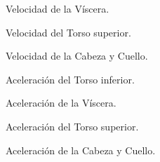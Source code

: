 \begin{figure}[htbp!]
  \centering
  \resizebox{\linewidth}{!}{
    
  }
  \caption{Velocidad de la Víscera.}
  \label{fig:v2}
\end{figure}

\begin{figure}[htbp!]
  \centering
  \resizebox{\linewidth}{!}{
    
  }
  \caption{Velocidad del Torso superior.}
  \label{fig:v3}
\end{figure}

\begin{figure}[htbp!]
  \centering
  \resizebox{\linewidth}{!}{
    
  }
  \caption{Velocidad de la Cabeza y Cuello.}
  \label{fig:v4}
\end{figure}

\begin{figure}[htbp!]
  \centering
  \resizebox{\linewidth}{!}{
    
  }
  \caption{Aceleración del Torso inferior.}
  \label{fig:a1}
\end{figure}

\begin{figure}[htbp!]
  \centering
  \resizebox{\linewidth}{!}{
    
  }
  \caption{Aceleración de la Víscera.}
  \label{fig:a2}
\end{figure}

\begin{figure}[htbp!]
  \centering
  \resizebox{\linewidth}{!}{
    
  }
  \caption{Aceleración del Torso superior.}
  \label{fig:a3}
\end{figure}

\begin{figure}[htbp!]
  \centering
  \resizebox{\linewidth}{!}{
    
  }
  \caption{Aceleración de la Cabeza y Cuello.}
  \label{fig:a4}
\end{figure}


